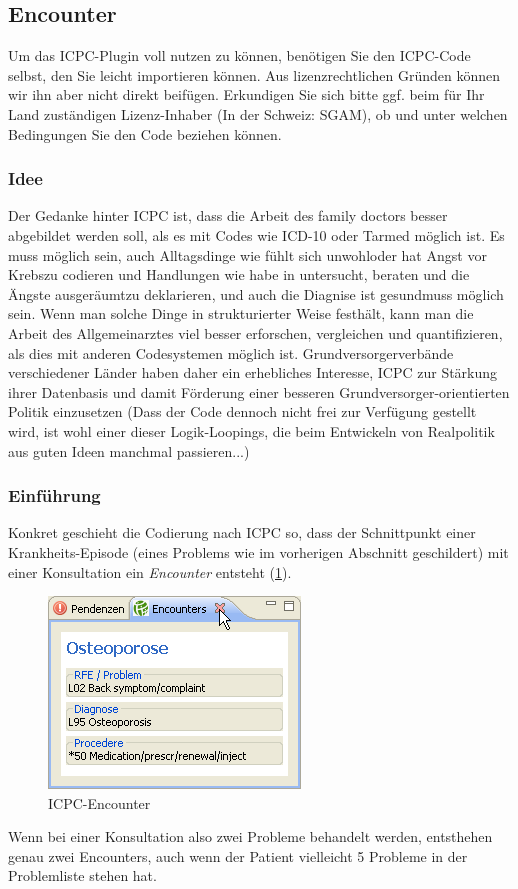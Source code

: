 \subsection{Encounter}
Um das ICPC-Plugin voll nutzen zu können, benötigen Sie den ICPC-Code selbst, den Sie leicht importieren können. Aus lizenzrechtlichen Gründen können wir ihn aber nicht direkt beifügen. Erkundigen Sie sich bitte ggf. beim für Ihr Land zuständigen Lizenz-Inhaber (In der Schweiz: SGAM), ob und unter welchen Bedingungen Sie den Code beziehen können.
\subsubsection{Idee}
Der Gedanke hinter ICPC ist, dass die Arbeit des family doctors besser abgebildet werden soll, als es mit Codes wie ICD-10 oder Tarmed möglich ist. Es muss möglich sein, auch Alltagsdinge wie \glqq fühlt sich unwohl\grqq oder \glqq hat Angst vor Krebs\grqq zu codieren und Handlungen wie \glqq habe in untersucht, beraten und die Ängste ausgeräumt\grqq zu deklarieren, und auch die Diagnise \glqq ist gesund\grqq muss möglich sein. Wenn man solche Dinge in strukturierter Weise festhält, kann man die Arbeit des Allgemeinarztes viel besser erforschen, vergleichen und quantifizieren, als dies mit anderen Codesystemen möglich ist. Grundversorgerverbände verschiedener Länder haben daher ein erhebliches Interesse, ICPC zur Stärkung ihrer Datenbasis und damit Förderung einer besseren Grundversorger-orientierten Politik einzusetzen (Dass der Code dennoch nicht frei zur Verfügung gestellt wird, ist wohl einer dieser Logik-Loopings, die beim Entwickeln von Realpolitik aus guten Ideen manchmal passieren...)

\subsubsection{Einführung}

Konkret geschieht die Codierung nach ICPC so, dass der Schnittpunkt einer Krankheits-Episode (eines Problems wie im vorherigen Abschnitt geschildert) mit einer Konsultation ein \textit{Encounter} entsteht (\ref{fig:encounter}).\\ 
\begin{figure}
\includegraphics{images/encounter}
\caption{ICPC-Encounter}
\label{fig:encounter}
\end{figure}
Wenn bei einer Konsultation also zwei Probleme behandelt werden, entsthehen genau zwei Encounters, auch wenn der Patient vielleicht 5 Probleme in der Problemliste stehen hat.

